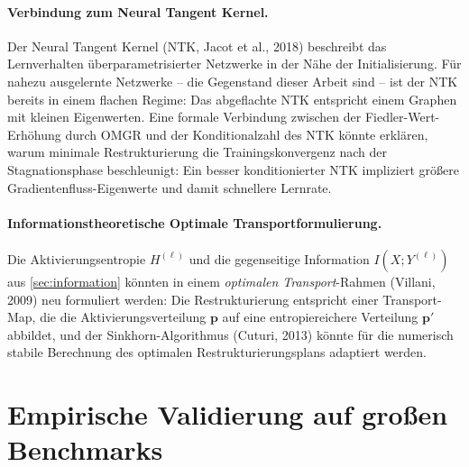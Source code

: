 ﻿\documentclass[12pt, a4paper, openany]{report}
\begin{document}
\paragraph{Verbindung zum Neural Tangent Kernel.}
Der Neural Tangent Kernel (NTK, Jacot et al., 2018) beschreibt das
Lernverhalten überparametrisierter Netzwerke in der Nähe der Initialisierung.
Für nahezu ausgelernte Netzwerke -- die Gegenstand dieser Arbeit sind --
ist der NTK bereits in einem flachen Regime: Das abgeflachte NTK
entspricht einem Graphen mit kleinen Eigenwerten.  Eine formale
Verbindung zwischen der Fiedler-Wert-Erhöhung durch OMGR und der
Konditionalzahl des NTK könnte erklären, warum minimale Restrukturierung
die Trainingskonvergenz nach der Stagnationsphase beschleunigt: Ein
besser konditionierter NTK impliziert größere Gradientenfluss-Eigenwerte
und damit schnellere Lernrate.

\paragraph{Informationstheoretische Optimale Transportformulierung.}
Die Aktivierungsentropie $H^{(\ell)}$ und die gegenseitige Information
$I(X; Y^{(\ell)})$ aus \cref{sec:information} könnten in einem
\emph{optimalen Transport}-Rahmen (Villani, 2009) neu formuliert werden:
Die Restrukturierung entspricht einer Transport-Map, die die
Aktivierungsverteilung $\bm{p}$ auf eine entropiereichere Verteilung
$\bm{p}'$ abbildet, und der Sinkhorn-Algorithmus (Cuturi, 2013) könnte
für die numerisch stabile Berechnung des optimalen Restrukturierungsplans
adaptiert werden.

\section{Empirische Validierung auf großen Benchmarks}
\label{sec:outlook_empirical}
\end{document}
